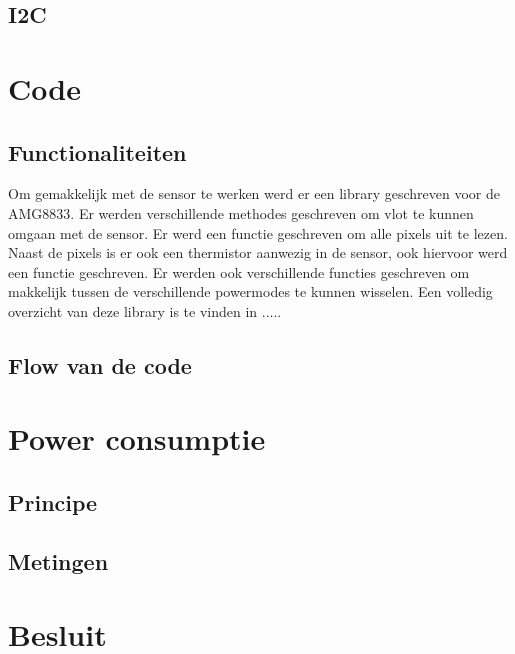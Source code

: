 \documentclass[]{article}
\begin{document}
\subsection{I2C}



\section{Code}
\subsection{Functionaliteiten}
Om gemakkelijk met de sensor te werken werd er een library geschreven voor de AMG8833. Er werden verschillende methodes geschreven om vlot te kunnen omgaan met de sensor. Er werd een functie geschreven om alle pixels uit te lezen. Naast de pixels is er ook een thermistor aanwezig in de sensor, ook hiervoor werd een functie geschreven. Er werden ook verschillende functies geschreven om makkelijk tussen de verschillende powermodes te kunnen wisselen. Een volledig overzicht van deze library is te vinden in .....

\subsection{Flow van de code}

\section{Power consumptie}
\subsection{Principe}

\subsection{Metingen}


\section{Besluit }
\end{document}
